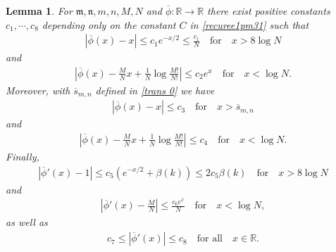 \documentclass[12pt]{amsart}
\numberwithin{equation}{section}
\newtheorem{lemma}[theorem]{Lemma}
\begin{document}
\begin{lemma}\label{Lemma5}
For $\mathfrak{m},\mathfrak{n},m,n,M,N$ and $\overline{\phi}:\mathbb{R}\to\mathbb{R}$ there exist positive constants $c_1,\cdots,c_8$ depending only on the constant $C$ in \eqref{recuree1pm31} such that
\begin{equation*}%
\begin{split}
|\overline{\phi}(x)-x|\leq c_1e^{-x/2}\leq \frac{c_1}{N} \quad \text{for} \quad x>8\log N
\end{split}
\end{equation*}
and
\begin{equation*}%
\begin{split}
\left|\overline{\phi}(x)-\frac{M}{N}x+\frac{1}{N}\log\frac{M!}{N!}\right|\leq c_2e^x \quad \text{for} \quad x<\log N.
\end{split}
\end{equation*}
Moreover, with $\overline{s}_{m,n}$ defined in \eqref{trans 0} we have
\begin{equation}\label{recuree1pm38}
\begin{split}
\left|\overline{\phi}(x)-x\right|\leq c_3 \quad \text{for} \quad x>\overline{s}_{m,n}
\end{split}
\end{equation}
and
\begin{equation*}%
\begin{split}
\left|\overline{\phi}(x)-\frac{M}{N}x+\frac{1}{N}\log\frac{M!}{N!}\right|\leq c_4 \quad \text{for} \quad x<\log N.
\end{split}
\end{equation*}
Finally,
\begin{equation*}%
\begin{split}
|\overline{\phi}'(x)-1|\leq c_5\left(e^{-x/2}+\beta(k)\right)\leq 2c_5\beta(k) \quad \text{for} \quad x>8\log N
\end{split}
\end{equation*}
and
\begin{equation*}%
\begin{split}
\left|\overline{\phi}'(x)-\frac{M}{N}\right|\leq \frac{c_6e^x}{N} \quad \text{for} \quad x<\log N,
\end{split}
\end{equation*}
as well as
\begin{equation*}%
\begin{split}
c_7\leq |\overline{\phi}'(x)|\leq c_8 \quad \text{for all} \quad x\in \mathbb{R}.
\end{split}
\end{equation*}

\end{lemma}
\end{document}
